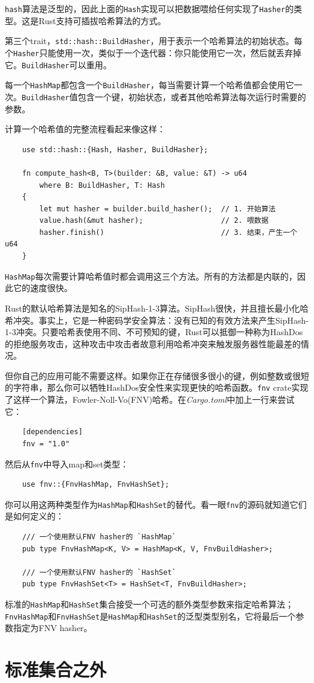 \texttt{hash}算法是泛型的，因此上面的\texttt{Hash}实现可以把数据喂给任何实现了\texttt{Hasher}的类型。这是Rust支持可插拔哈希算法的方式。

第三个trait，\texttt{std::hash::BuildHasher}，用于表示一个哈希算法的初始状态。每个\texttt{Hasher}只能使用一次，类似于一个迭代器：你只能使用它一次，然后就丢弃掉它。\texttt{BuildHasher}可以重用。

每一个\texttt{HashMap}都包含一个\texttt{BuildHasher}，每当需要计算一个哈希值都会使用它一次。\texttt{BuildHasher}值包含一个键，初始状态，或者其他哈希算法每次运行时需要的参数。

计算一个哈希值的完整流程看起来像这样：
\begin{verbatim}
    use std::hash::{Hash, Hasher, BuildHasher};

    fn compute_hash<B, T>(builder: &B, value: &T) -> u64
        where B: BuildHasher, T: Hash
    {
        let mut hasher = builder.build_hasher();  // 1. 开始算法
        value.hash(&mut hasher);                  // 2. 喂数据
        hasher.finish()                           // 3. 结束，产生一个u64
    }
\end{verbatim}

\texttt{HashMap}每次需要计算哈希值时都会调用这三个方法。所有的方法都是内联的，因此它的速度很快。

Rust的默认哈希算法是知名的SipHash-1-3算法。SipHash很快，并且擅长最小化哈希冲突。事实上，它是一种密码学安全算法：没有已知的有效方法来产生SipHash-1-3冲突。只要哈希表使用不同、不可预知的键，Rust可以抵御一种称为HashDos的拒绝服务攻击，这种攻击中攻击者故意利用哈希冲突来触发服务器性能最差的情况。

但你自己的应用可能不需要这样。如果你正在存储很多很小的键，例如整数或很短的字符串，那么你可以牺牲HashDos安全性来实现更快的哈希函数。\texttt{fnv} crate实现了这样一个算法，Fowler-Noll-Vo(FNV)哈希。在\emph{Cargo.toml}中加上一行来尝试它：
\begin{verbatim}
    [dependencies]
    fnv = "1.0"
\end{verbatim}

然后从\texttt{fnv}中导入map和set类型：
\begin{verbatim}
    use fnv::{FnvHashMap, FnvHashSet};
\end{verbatim}

你可以用这两种类型作为\texttt{HashMap}和\texttt{HashSet}的替代。看一眼\texttt{fnv}的源码就知道它们是如何定义的：
\begin{verbatim}
    /// 一个使用默认FNV hasher的 `HashMap`
    pub type FnvHashMap<K, V> = HashMap<K, V, FnvBuildHasher>;

    /// 一个使用默认FNV hasher的 `HashSet`
    pub type FnvHashSet<T> = HashSet<T, FnvBuildHasher>;
\end{verbatim}

标准的\texttt{HashMap}和\texttt{HashSet}集合接受一个可选的额外类型参数来指定哈希算法；\texttt{FnvHashMap}和\texttt{FnvHashSet}是\texttt{HashMap}和\texttt{HashSet}的泛型类型别名，它将最后一个参数指定为FNV hasher。

\section{标准集合之外}


